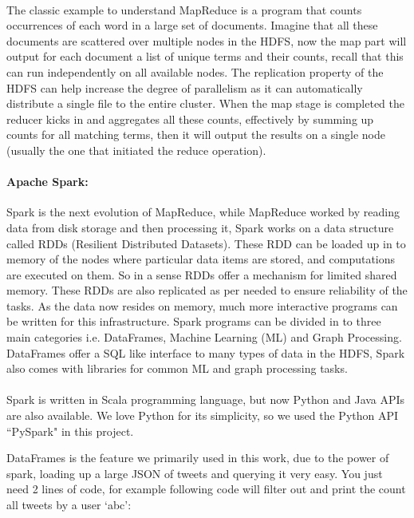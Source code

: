 \documentclass[12pt]{report}
\theoremstyle{named}
\begin{document}
\paragraph{}The classic example to understand MapReduce is a program that counts occurrences of each word in a large set of documents. Imagine that all these documents are scattered over multiple nodes in the HDFS, now the map part will output for each document a list of unique terms and their counts, recall that this can run independently on all available nodes. The replication property of the HDFS can help increase the degree of parallelism as it can automatically distribute a single file to the entire cluster. When the map stage is completed the reducer kicks in and aggregates all these counts, effectively by summing up counts for all matching terms, then it will output the results on a single node (usually the one that initiated the reduce operation).

\paragraph{Apache Spark:\\}
Spark is the next evolution of MapReduce, while MapReduce worked by reading data from disk storage and then processing it, Spark works on a data structure called RDDs (Resilient Distributed Datasets). These RDD can be loaded up in to memory of the nodes where particular data items are stored, and computations are executed on them. So in a sense RDDs offer a mechanism for limited shared memory. These RDDs are also replicated as per needed to ensure reliability of the tasks. As the data now resides on memory, much more interactive programs can be written for this infrastructure. Spark programs can be divided in to three main categories i.e. DataFrames, Machine Learning (ML) and Graph Processing. DataFrames offer a SQL like interface to many types of data in the HDFS, Spark also comes with libraries for common ML and graph processing tasks.

\paragraph{}
Spark is written in Scala programming language, but now Python and Java APIs are also available. We love Python for its simplicity, so we used the Python API ``PySpark" in this project.

DataFrames is the feature we primarily used in this work, due to the power of spark, loading up a large JSON of tweets and querying it very easy. You just need 2 lines of code, for example following code will filter out and print the count all tweets by a user `abc':
\end{document}
